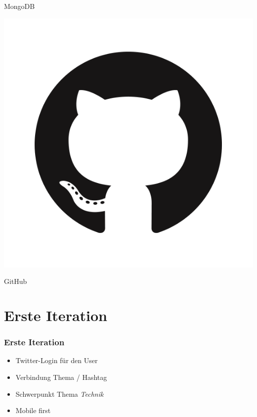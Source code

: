 \documentclass{beamer}
\begin{document}
\begin{frame}
\begin{minipage}{.3\textwidth}
  \end{minipage}%
  \hfill
  \begin{minipage}{.7\textwidth}
    MongoDB \pause \\    
  \end{minipage}
  \begin{minipage}{.3\textwidth}
    \includegraphics[height=.3\textheight]{GitHub}
  \end{minipage}%
  \hfill
  \begin{minipage}{.7\textwidth}
    GitHub \\    
  \end{minipage}

\end{frame}

\section{Erste Iteration}
\begin{frame}
  \frametitle{Erste Iteration} \pause
  \begin{itemize}
    \item Twitter-Login für den User \pause
    \item Verbindung Thema / Hashtag \pause
    \item Schwerpunkt Thema \textit{Technik} \pause
    \item Mobile first
  \end{itemize}
  
\end{frame}
\end{document}
